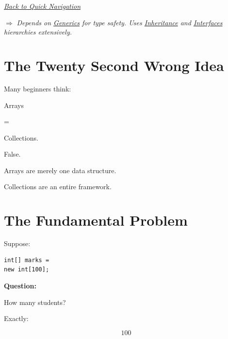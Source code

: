 \documentclass[11pt,a4paper]{book}
\begin{document}
\smallskip
\noindent
\hyperref[sec:quick_nav]{\emph{Back to Quick Navigation}}

\smallskip
\noindent
\textcolor{RosettaRoyalPurple}{$\Rightarrow$}
\emph{Depends on \hyperref[chap:generics]{Generics} for type safety. Uses \hyperref[chap:inheritance]{Inheritance} and \hyperref[chap:interfaces]{Interfaces} hierarchies extensively.}


\section{The Twenty Second Wrong Idea}

\begin{trap}

Many beginners think:

Arrays

=

Collections.


False.


Arrays are merely one data structure.


Collections are an entire framework.

\end{trap}


\section{The Fundamental Problem}

Suppose:

\begin{verbatim} 
int[] marks =
new int[100];
\end{verbatim}


\textbf{Question:}

How many students?


Exactly:

\[
100
\]
\end{document}
